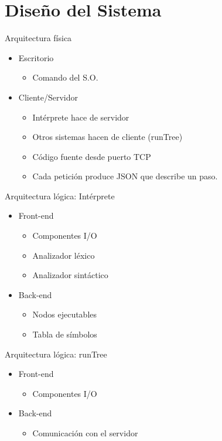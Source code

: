 \documentclass[spanish]{beamer}
\begin{document}
\section{Diseño del Sistema}
\begin{frame}{Arquitectura física}
   \begin{itemize}
      \item Escritorio 
      \begin{itemize}
         \item Comando del S.O.
      \end{itemize}
      \item Cliente/Servidor
      \begin{itemize}
         \item Intérprete hace de servidor
         \item Otros sistemas hacen de cliente (runTree)
         \item Código fuente desde puerto TCP
         \item Cada petición produce JSON que describe un paso.
      \end{itemize}
   \end{itemize}
\end{frame}
\begin{frame}{Arquitectura lógica: Intérprete}
   \begin{itemize}
         \item Front-end
         \begin{itemize}
             \item Componentes I/O
             \item Analizador léxico 
             \item Analizador sintáctico
         \end{itemize}
         \item Back-end
         \begin{itemize}
            \item Nodos ejecutables
            \item Tabla de símbolos
         \end{itemize}
      \end{itemize}
\end{frame}
\begin{frame}{Arquitectura lógica: runTree}
   \begin{itemize}
         \item Front-end
         \begin{itemize}
             \item Componentes I/O
         \end{itemize}
         \item Back-end
         \begin{itemize}
            \item Comunicación con el servidor
         \end{itemize}
      \end{itemize}
\end{frame}
\end{document}
